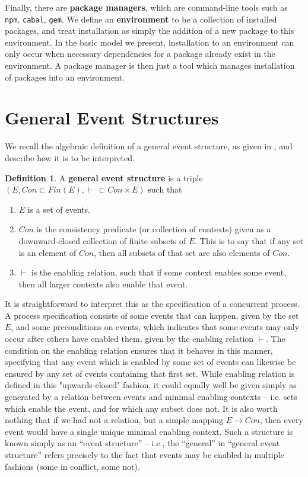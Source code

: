 \documentclass[hoptionsi,review,screen,format=sigconf]{acmart}
\theoremstyle{definition}
\newtheorem{definition}{Definition}[section]
\begin{document}
Finally, there are \textbf{package managers}, which are command-line tools such as \texttt{npm}, \texttt{cabal}, \texttt{gem}. We define an \textbf{environment} to be a collection of installed packages, and treat installation as simply the addition of a new package to this environment. In the basic model we present, installation to an environment can only occur when necessary dependencies for a package already exist in the environment. A package manager is then just a tool which manages installation of packages into an environment.

\section{General Event Structures}


We recall the algebraic definition of a general event structure, as given in \cite{winskel1986event}, and describe how it is to be interpreted.

\begin{definition}
A \textbf{general event structure} is a triple \((E, Con \subset Fin(E), \vdash \, \subset Con \times E)\) such that

 \renewcommand{\labelenumi}{\roman{enumi}}
  \begin{enumerate}
   \item \(E\) is a set of events.
   \item \(Con\) is the consistency predicate (or collection of contexts) given as a downward-closed collection of finite subsets of \(E\). This is to say that if any set is an element of \(Con\), then all subsets of that set are also elements of \(Con\).
   \item \(\vdash\) is the enabling relation, such that if some context enables some event, then all larger contexts also enable that event.
 \end{enumerate}
\end{definition}

It is straightforward to interpret this as the specification of a concurrent process. A process specification consists of some events that can happen, given by the set \(E\), and some preconditions on events, which indicates that some events may only occur after others have enabled them, given by the enabling relation \(\vdash\). The condition on the enabling relation ensures that it behaves in this manner, specifying that any event which is enabled by some set of events can likewise be ensured by any set of events containing that first set. While enabling relation is defined in this "upwards-closed" fashion, it could equally well be given simply as generated by a relation between events and minimal enabling contexts -- i.e. sets which enable the event, and for which any subset does not. It is also worth nothing that if we had not a relation, but a simple mapping \(E \to Con\), then every event would have a single unique minimal enabling context. Such a structure is known simply as an ``event structure'' -- i.e., the ``general'' in ``general event structure'' refers precisely to the fact that events may be enabled in multiple fashions (some in conflict, some not).
\end{document}
